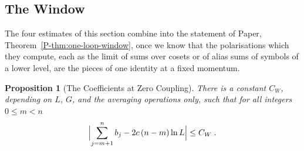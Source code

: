 \documentclass[11pt]{preprint}
\numberwithin{equation}{section}
\newtheorem{proposition}{Proposition}
\theoremstyle{definition}
\theoremstyle{remark}
\theoremstyle{plain}
\begin{document}
\subsection{The Window}\label{sec:window}

The four estimates of this section combine into the statement of Paper, Theorem~\ref{P-thm:one-loop-window}, once we know that the polarisations which they compute, each as the limit of sums over cosets or of alias sums of symbols of a lower level, are the pieces of one identity at a fixed momentum.

\begin{proposition}[The Coefficients at Zero Coupling]\label{prop:one-loop-window}
There is a constant $C_W$, depending on $L$, $G$, and the averaging operations only, such that for all integers $0 \leq m < n$
\begin{equation}\label{eq:window}
    \Bigl\lvert\sum_{j=m+1}^{n}b_j - 2c\,(n - m)\ln L\Bigr\rvert \leq C_W\;.
\end{equation}
\end{proposition}
\end{document}
